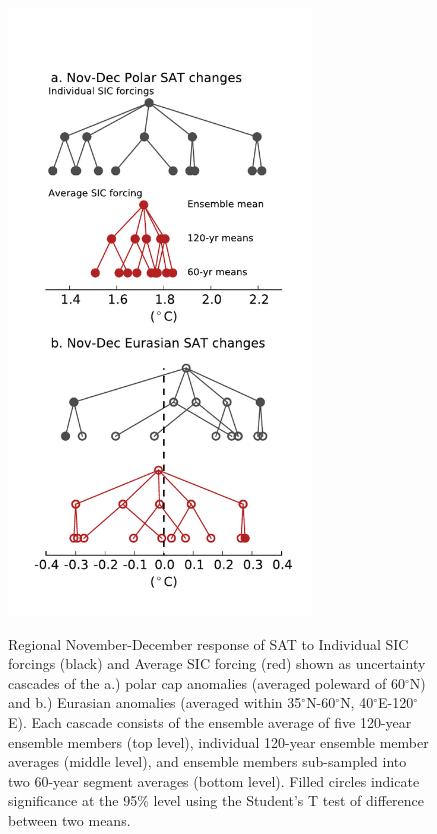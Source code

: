 \documentclass[grl]{AGUTeX}  %
\begin{document}
\begin{article}
\begin{figure}[t]
  \noindent\includegraphics[width=19pc,angle=0]{fig2.pdf} \\ 
  \caption{Regional November-December response of SAT to Individual SIC forcings (black) and Average SIC forcing (red) shown as uncertainty cascades of the a.) polar cap anomalies (averaged poleward of 60$^\circ$N) and b.) Eurasian anomalies (averaged within 35$^\circ$N-60$^\circ$N, 40$^\circ$E-120$^\circ$E). Each cascade consists of the ensemble average of five 120-year ensemble members (top level),  individual 120-year ensemble member averages (middle level), and ensemble members sub-sampled into two 60-year segment averages (bottom level). Filled circles indicate significance at the 95\% level using the Student's T test of difference between two means.
}\label{fig:fig2}
\end{figure}


\end{article}
\end{document}

